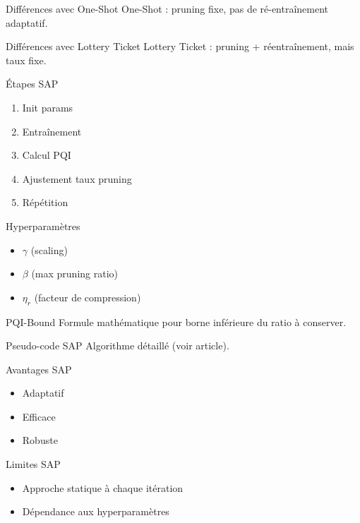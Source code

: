 \documentclass{beamer}
\begin{document}
\begin{frame}{Différences avec One-Shot}
One-Shot : pruning fixe, pas de ré-entraînement adaptatif.
\end{frame}

\begin{frame}{Différences avec Lottery Ticket}
Lottery Ticket : pruning + réentraînement, mais taux fixe.
\end{frame}

\begin{frame}{Étapes SAP}
\begin{enumerate}
\item Init params
\item Entraînement
\item Calcul PQI
\item Ajustement taux pruning
\item Répétition
\end{enumerate}
\end{frame}

\begin{frame}{Hyperparamètres}
\begin{itemize}
\item $\gamma$ (scaling)
\item $\beta$ (max pruning ratio)
\item $\eta_r$ (facteur de compression)
\end{itemize}
\end{frame}

\begin{frame}{PQI-Bound}
Formule mathématique pour borne inférieure du ratio à conserver.
\end{frame}

\begin{frame}{Pseudo-code SAP}
Algorithme détaillé (voir article).
\end{frame}

\begin{frame}{Avantages SAP}
\begin{itemize}
\item Adaptatif
\item Efficace
\item Robuste
\end{itemize}
\end{frame}

\begin{frame}{Limites SAP}
\begin{itemize}
\item Approche statique à chaque itération
\item Dépendance aux hyperparamètres
\end{itemize}
\end{frame}
\end{document}
